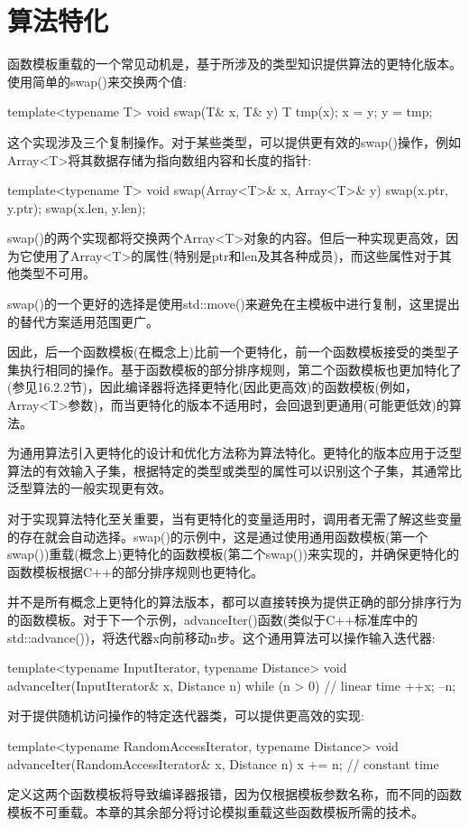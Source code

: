 \section{算法特化}

函数模板重载的一个常见动机是，基于所涉及的类型知识提供算法的更特化版本。使用简单的swap()来交换两个值:

\begin{cpp}
template<typename T>
void swap(T& x, T& y)
{
	T tmp(x);
	x = y;
	y = tmp;
}
\end{cpp}

这个实现涉及三个复制操作。对于某些类型，可以提供更有效的swap()操作，例如Array<T>将其数据存储为指向数组内容和长度的指针:

\begin{cpp}
template<typename T>
void swap(Array<T>& x, Array<T>& y)
{
	swap(x.ptr, y.ptr);
	swap(x.len, y.len);
}
\end{cpp}

swap()的两个实现都将交换两个Array<T>对象的内容。但后一种实现更高效，因为它使用了Array<T>的属性(特别是ptr和len及其各种成员)，而这些属性对于其他类型不可用。

\begin{notice}
swap()的一个更好的选择是使用std::move()来避免在主模板中进行复制，这里提出的替代方案适用范围更广。
\end{notice}

因此，后一个函数模板(在概念上)比前一个更特化，前一个函数模板接受的类型子集执行相同的操作。基于函数模板的部分排序规则，第二个函数模板也更加特化了(参见16.2.2节)，因此编译器将选择更特化(因此更高效)的函数模板(例如，Array<T>参数)，而当更特化的版本不适用时，会回退到更通用(可能更低效)的算法。

为通用算法引入更特化的设计和优化方法称为算法特化。更特化的版本应用于泛型算法的有效输入子集，根据特定的类型或类型的属性可以识别这个子集，其通常比泛型算法的一般实现更有效。

对于实现算法特化至关重要，当有更特化的变量适用时，调用者无需了解这些变量的存在就会自动选择。swap()的示例中，这是通过使用通用函数模板(第一个swap())重载(概念上)更特化的函数模板(第二个swap())来实现的，并确保更特化的函数模板根据C++的部分排序规则也更特化。

并不是所有概念上更特化的算法版本，都可以直接转换为提供正确的部分排序行为的函数模板。对于下一个示例，advanceIter()函数(类似于C++标准库中的std::advance())，将迭代器x向前移动n步。这个通用算法可以操作输入迭代器:

\begin{cpp}
template<typename InputIterator, typename Distance>
void advanceIter(InputIterator& x, Distance n)
{
	while (n > 0) { // linear time
		++x;
		--n;
	}
}
\end{cpp}

对于提供随机访问操作的特定迭代器类，可以提供更高效的实现:

\begin{cpp}
template<typename RandomAccessIterator, typename Distance>
void advanceIter(RandomAccessIterator& x, Distance n) {
	x += n; // constant time
}
\end{cpp}

定义这两个函数模板将导致编译器报错，因为仅根据模板参数名称，而不同的函数模板不可重载。本章的其余部分将讨论模拟重载这些函数模板所需的技术。











